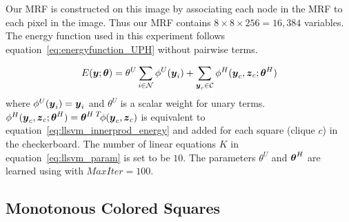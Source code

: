 Our MRF is constructed on this image by associating each node in
the MRF to each pixel in the image. Thus our MRF contains $8
\times 8 \times 256 = 16,384$ variables. The energy function used
in this experiment follows equation~\eqref{eq:energyfunction_UPH}
without pairwise terms.

\begin{align}
  \label{eq:syncheck_energy}
  E({\boldsymbol{y}};\boldsymbol{\theta})=\theta^U\sum_{i\in {\cal N}}{\phi^U({\boldsymbol{y}}_i)}+
  \sum_{{\boldsymbol{y}}_c\in {\cal C}}{\phi^H({\boldsymbol{y}}_c,{\boldsymbol{z}}_c;\boldsymbol{\theta}^H)}
\end{align}
where $\phi^U({\boldsymbol{y}}_i)={\boldsymbol{y}}_i$ and $\theta^U$ is a scalar weight for
unary terms. $\phi^H({\boldsymbol{y}}_c,{\boldsymbol{z}}_c;\boldsymbol{\theta}^H)=\boldsymbol{\theta}^{H\;T} \!
\phi({\boldsymbol{y}}_c,{\boldsymbol{z}}_c)$ is equivalent to
equation~\eqref{eq:llsvm_innerprod_energy} and added for each
square (clique $c$) in the checkerboard. The number of linear
equations $K$ in equation~\eqref{eq:llsvm_param} is set to be
$10$. The parameters $\theta^U$ and $\boldsymbol{\theta}^H$ are learned using
 with $MaxIter=100$. 

\subsection{Monotonous Colored Squares}
\label{sec:monot-color-squar}

